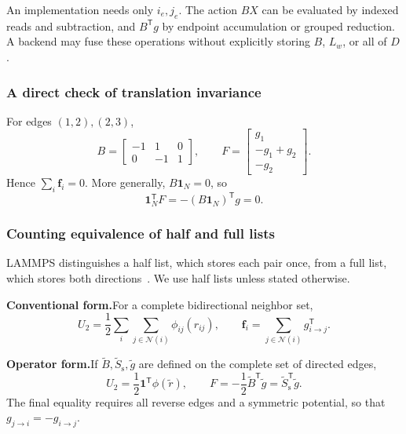 \documentclass[11pt,a4paper]{article}
\newcommand{\oldform}{\par\noindent\textbf{Conventional form.}\quad}
\newcommand{\newform}{\par\noindent\textbf{Operator form.}\quad}
\newcommand{\ones}{\mathbf 1}
\newcommand{\vect}[1]{\bm{#1}}
\newcommand{\src}{S_{\mathrm s}}
\theoremstyle{definition}
\begin{document}
An implementation needs only $i_e,j_e$. The action $BX$ can be evaluated by indexed reads and
subtraction, and $B^{\mathsf T}g$ by endpoint accumulation or grouped reduction. A backend may
fuse these operations without explicitly storing $B$, $L_w$, or all of $D$.

\subsubsection{A direct check of translation invariance}
For edges $(1,2),(2,3)$,
\begin{equation}
B=\begin{bmatrix}-1&1&0\\0&-1&1\end{bmatrix},\qquad
F=\begin{bmatrix}g_1\\-g_1+g_2\\-g_2\end{bmatrix}.
\end{equation}
Hence $\sum_i\vect f_i=0$. More generally, $B\ones_N=0$, so
\begin{equation}
\ones_N^{\mathsf T}F=-(B\ones_N)^{\mathsf T}g=0.
\label{eq:net-force}
\end{equation}

\subsubsection{Counting equivalence of half and full lists}
LAMMPS distinguishes a half list, which stores each pair once, from a full list, which stores
both directions~\cite{lammps-neighbor}. We use half lists unless stated otherwise.

\oldform For a complete bidirectional neighbor set,
\begin{equation}
U_2=\frac12\sum_i\sum_{j\in\mathcal N(i)}\phi_{ij}(r_{ij}),\qquad
\vect f_i=\sum_{j\in\mathcal N(i)}g_{i\to j}^{\mathsf T}.
\end{equation}
\newform If $\widetilde B,\widetilde\src,\widetilde g$ are defined on the complete set of directed edges,
\begin{equation}
U_2=\frac12\ones^{\mathsf T}\phi(\widetilde r),\qquad
F=-\frac12\widetilde B^{\mathsf T}\widetilde g
=\widetilde\src^{\mathsf T}\widetilde g.
\label{eq:full-list}
\end{equation}
The final equality requires all reverse edges and a symmetric potential, so that $g_{j\to
i}=-g_{i\to j}$.
\end{document}

